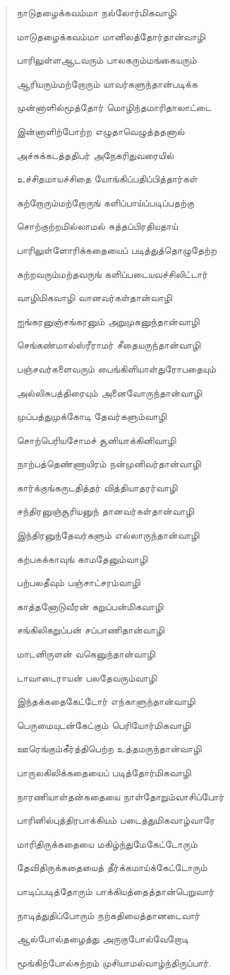 \documentclass{article}
\begin{document}
\begin{quotation}
{நாடுதழைக்கவம்மா நல்லோர்மிகவாழி

மாடுதழைக்கவம்மா மானிலத்தோர்தான்வாழி

பாரிலுள்ளஆடவரும் பாலகரும்மங்கையரும்

ஆரியரும்மற்றோரும் யாவர்களுந்தான்படிக்க

முன்னாளில்மூத்தோர் மொழிந்தமாரிதாலாட்டை

இன்னாளிற்போற்ற எழுதாவெழுத்ததனால்

அச்சுக்கடத்ததிபர் அநேகரிதுவரையில்

உச்சிதமாயச்சிதை யோங்கிப்பதிப்பித்தார்கள்

கற்றோரும்மற்றோருங் களிப்பாய்ப்படிப்பதற்கு

சொற்குற்றமில்லாமல் சுத்தப்பிரதியதாய்

பாரிலுள்ளோரிக்கதையைப் படித்துத்தொழுதேற்ற

கற்றவரும்மற்தவருங் களிப்படையவச்சிலிட்டார்

வாழிமிகவாழி வானவர்கள்‌தான்வாழி

ஐங்கரனுஞ்சங்கரனும் அறுமுகனுந்தான்வாழி

செங்கண்மால்ஸ்ரீராமர் சீதையருந்தான்வாழி

பஞ்சவர்களைவரும் பைங்கிளியாள்துரோபதையும்

அல்லிசுபத்திரையும் அனைவோருந்தான்வாழி

முப்பத்துமுக்கோடி தேவர்களும்வாழி

சொற்பெரியசோமச் சூனியாக்கினிவாழி

நாற்பத்தெண்ணாயிரம் நன்முனிவர்தான்வாழி

கார்க்குங்கருடதித்தர்‌ வித்தியாதரர்வாழி

சந்திரனுஞ்சூரியனுந் தானவர்கள்தான்வாழி

இந்திரனுந்தேவர்களும் எல்லாருந்தான்வாழி

கற்பகக்காவுங் காமதேனும்வாழி

பற்பலதீவும் பஞ்சாட்சரம்வாழி

காத்தனோடுவீரன் கறுப்பன்மிகவாழி

சங்கிலிகறுப்பன் சப்பாணிதான்வாழி

மாடனிருளன் வகெனுந்தான்வாழி

டாவாடைராயன் பலதேவரும்வாழி

இந்தக்கதைகேட்டோர் எந்காளுந்தான்வாழி

பெருமையுடன்கேட்கும் பெரியோர்மிகவாழி

ஊரெங்கும்கீர்த்திபெற்ற உத்தமருந்தான்வாழி

பாருலகிலிக்கதையைப் படித்தோர்மிகவாழி

நாரணியாள்தன்கதையை நாள்தோறும்வாசிப்போர்

பாரினில்புத்திரபாக்கியம் படைத்துமிகவாழ்வாரே

மாரிதிருக்கதையை மகிழ்ந்துமேகேட்டோரும்

தேவிதிருக்கதையைத் தீர்க்கமாய்க்கேட்டோரும்

பாடிப்படித்தோரும் பாக்கியத்தைத்தான்பெறுவார்

நாடித்துதிப்போரும் நற்கதியைத்தானடைவார்

ஆல்போல்தழைத்து அருகுபோல்வேறாேடி

மூங்கிற்போல்சுற்றம் முசியாமல்வாழ்ந்திருப்பார்.
}
\end{quotation}
\end{document}
